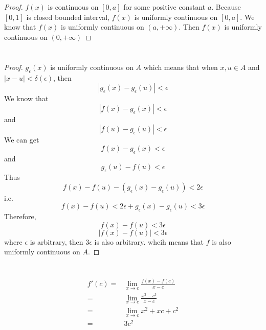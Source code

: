 \documentclass{article}
\begin{document}
    \section{}
        \begin{proof}
            $f(x)$ is continuous on $[0,a]$ for some positive constant $a$. Because $[0,1]$ is closed bounded interval, $f(x)$ is uniformly continuous on $[0,a]$. We know that $f(x)$ is uniformly continuous on $(a,+\infty)$. Then $f(x)$ is uniformly continuous on $(0,+\infty)$ 
        \end{proof}

    \section{}
        \begin{proof}
            $g_\epsilon(x)$ is uniformly continuous on $A$ which means that when $x,u\in A$ and $|x-u|<\delta(\epsilon)$, then $$|g_\epsilon(x)-g_\epsilon(u)|<\epsilon$$
            We know that
            $$|f(x)-g_\epsilon(x)|<\epsilon$$
            and 
            $$|f(u)-g_\epsilon(u)|<\epsilon$$
            We can get
            $$f(x)-g_\epsilon(x)<\epsilon$$
            and 
            $$g_\epsilon(u)-f(u)<\epsilon$$
            Thus
            $$f(x)-f(u)-(g_\epsilon(x)-g_\epsilon(u))<2\epsilon$$
            i.e.
            $$f(x)-f(u)<2\epsilon+g_\epsilon(x)-g_\epsilon(u)<3\epsilon$$
            Therefore,
            $$f(x)-f(u)<3\epsilon$$
            $$|f(x)-f(u)|<3\epsilon$$
            where $\epsilon$ is arbitrary, then $3\epsilon$ is also arbitrary.
            whcih means that $f$ is also uniformly continuous on $A$.
        \end{proof}
    \section{}
        
    \section{}
        \subsection{}
            \paragraph{
                \begin{equation*}
                    \begin{split}
                        f'(c)=&\lim _{x\rightarrow c}\frac{f(x)-f(c)}{x-c}\\
                            =&\lim _{x\rightarrow c} \frac{x^3-c^3}{x-c}\\
                            =&\lim _{x\rightarrow c} x^2+xc+c^2\\
                            =&3c^2
                    \end{split}
                \end{equation*}
            }
\end{document}

